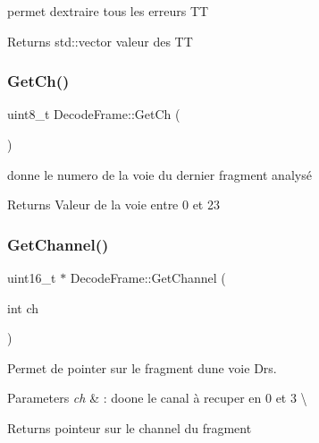 permet d\textquotesingle{}extraire tous les erreurs TT 

\begin{DoxyReturn}{Returns}
std\+::vector valeur des TT 
\end{DoxyReturn}
\mbox{\label{classDecodeFrame_a9a29ecf0f789fb4afaf0d6fc1fbe9cc2}} 
\subsubsection{\texorpdfstring{Get\+Ch()}{GetCh()}}
{\footnotesize\ttfamily uint8\+\_\+t Decode\+Frame\+::\+Get\+Ch (\begin{DoxyParamCaption}{ }\end{DoxyParamCaption})\hspace{0.3cm}{\ttfamily [inline]}}



donne le numero de la voie du dernier fragment analysé 

\begin{DoxyReturn}{Returns}
Valeur de la voie entre 0 et 23 
\end{DoxyReturn}
\mbox{\label{classDecodeFrame_ad2fe83b67344c853dc9434a56007ad20}} 
\subsubsection{\texorpdfstring{Get\+Channel()}{GetChannel()}}
{\footnotesize\ttfamily uint16\+\_\+t $\ast$ Decode\+Frame\+::\+Get\+Channel (\begin{DoxyParamCaption}\item[{int}]{ch }\end{DoxyParamCaption})}



Permet de pointer sur le fragment d\textquotesingle{}une voie Drs. 


\begin{DoxyParams}{Parameters}
{\em ch} & \+: doone le canal à recuper en 0 et 3 \textbackslash{} \\
\hline
\end{DoxyParams}
\begin{DoxyReturn}{Returns}
pointeur sur le channel du fragment 
\end{DoxyReturn}
\mbox{\label{classDecodeFrame_ab9c8da95989c9d1d3cb7bb28d2ac5811}} 
